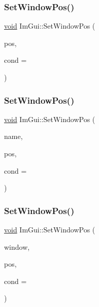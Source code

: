 \mbox{\label{namespaceImGui_aaa81e004de4c0a5cedb836e92e8aa0e5}} 
\subsubsection{\texorpdfstring{Set\+Window\+Pos()}{SetWindowPos()}\hspace{0.1cm}{\footnotesize\ttfamily [1/3]}}
{\footnotesize\ttfamily \hyperlink{imgui__impl__opengl3__loader_8h_ac668e7cffd9e2e9cfee428b9b2f34fa7}{void} Im\+Gui\+::\+Set\+Window\+Pos (\begin{DoxyParamCaption}\item[{const \hyperlink{structImVec2}{Im\+Vec2} \&}]{pos,  }\item[{Im\+Gui\+Cond}]{cond = {} }\end{DoxyParamCaption})}

\mbox{\label{namespaceImGui_a32032b56f975bb3145adbe19f38f3b56}} 
\subsubsection{\texorpdfstring{Set\+Window\+Pos()}{SetWindowPos()}\hspace{0.1cm}{\footnotesize\ttfamily [2/3]}}
{\footnotesize\ttfamily \hyperlink{imgui__impl__opengl3__loader_8h_ac668e7cffd9e2e9cfee428b9b2f34fa7}{void} Im\+Gui\+::\+Set\+Window\+Pos (\begin{DoxyParamCaption}\item[{const char $\ast$}]{name,  }\item[{const \hyperlink{structImVec2}{Im\+Vec2} \&}]{pos,  }\item[{Im\+Gui\+Cond}]{cond = {} }\end{DoxyParamCaption})}

\mbox{\label{namespaceImGui_a77f1cca87a93a1411781d00a1b63ef45}} 
\subsubsection{\texorpdfstring{Set\+Window\+Pos()}{SetWindowPos()}\hspace{0.1cm}{\footnotesize\ttfamily [3/3]}}
{\footnotesize\ttfamily \hyperlink{imgui__impl__opengl3__loader_8h_ac668e7cffd9e2e9cfee428b9b2f34fa7}{void} Im\+Gui\+::\+Set\+Window\+Pos (\begin{DoxyParamCaption}\item[{\hyperlink{structImGuiWindow}{Im\+Gui\+Window} $\ast$}]{window,  }\item[{const \hyperlink{structImVec2}{Im\+Vec2} \&}]{pos,  }\item[{Im\+Gui\+Cond}]{cond = {} }\end{DoxyParamCaption})}

